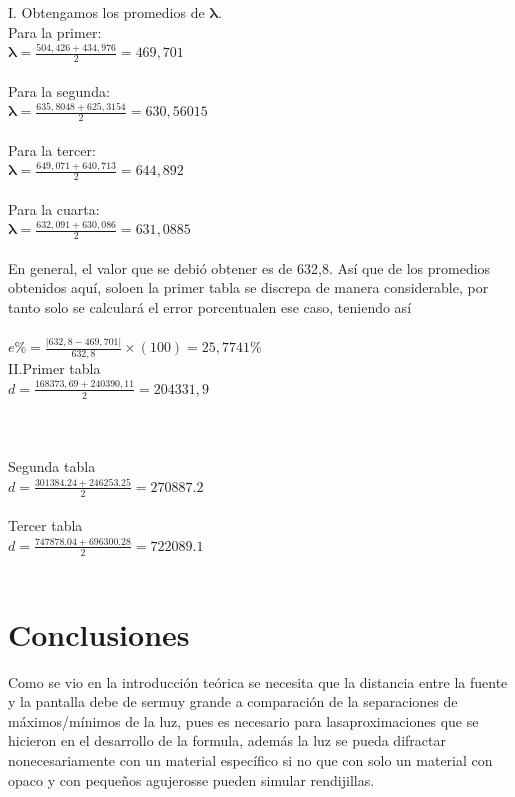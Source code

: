 \documentclass[13,twocolumn,letterpaper]{article}
\begin{document}
I. Obtengamos los promedios de  $\mathbf{\lambda}$.\\

Para la primer:\\

$\mathbf{\lambda}=\frac{504,426+434,976}{2}=469,701$\\
\\
Para la segunda: \\

$\mathbf{\lambda}=\frac{635,8048+625,3154}{2}=630,56015$\\
\\
Para la tercer:\\

$\mathbf{\lambda}=\frac{649,071+640,713}{2}=644,892$\\
\\
Para la cuarta: \\

$\mathbf{\lambda}=\frac{632,091+630,086}{2}=631,0885$\\
\\
En general, el valor que se debió obtener es de 632,8. Así que de los promedios obtenidos aquí, soloen la primer tabla se discrepa de manera considerable, por tanto solo se calculará el error porcentualen ese caso, teniendo así  
\\
\\
$e\%=\frac{|632,8−469,701|}{632,8}\times(100) = 25,7741\%$
\\  

II.Primer tabla\\

$d=\frac{168373,69+240390,11}{2}=204331,9$\\
\\
\\
\\
Segunda tabla\\

$d=\frac{301384.24+246253.25}{2}=270887.2$\\
\\
Tercer tabla\\

$d=\frac{747878.04+696300.28}{2}=722089.1$\\

\\
\section*{Conclusiones}

Como se vio en la introducción teórica se necesita que la distancia entre la fuente y la pantalla debe de sermuy grande a comparación de la separaciones de máximos/mínimos de la luz, pues es necesario para lasaproximaciones   que   se   hicieron   en   el   desarrollo   de   la   formula,   además   la   luz   se   pueda   difractar   nonecesariamente con un material específico si no que con solo un material con opaco y con pequeños agujerosse pueden simular rendijillas.
 


\nocite{Hecht}\nocite{Rossi}\nocite{Sears}\nocite{Born}\nocite{Tipler}\nocite{Feynman}\nocite{Res}


\end{document}
